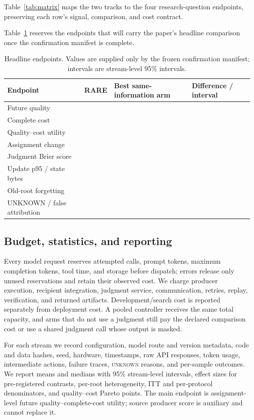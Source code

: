 \documentclass[sigconf,anonymous]{aamas}
\newcommand{\blank}{\textemdash}
\newcommand{\unknown}{\textsc{unknown}}
\begin{document}
Table~\ref{tab:matrix} maps the two tracks to the four research-question endpoints, preserving each row's signal, comparison, and cost contract.

Table~\ref{tab:headline} reserves the endpoints that will carry the paper's headline comparison once the confirmation manifest is complete.
\begin{table}[t]
\centering\small
\caption{Headline endpoints. Values are supplied only by the frozen confirmation manifest; intervals are stream-level 95\% intervals.}
\label{tab:headline}
\begin{tabular}{p{}p{}p{}p{}}
\toprule
Endpoint & RARE & Best same-information arm & Difference / interval\\
\midrule
Future quality & \blank & \blank & \blank\\
Complete cost & \blank & \blank & \blank\\
Quality--cost utility & \blank & \blank & \blank\\
Assignment change & \blank & \blank & \blank\\
Judgment Brier score & \blank & \blank & \blank\\
Update p95 / state bytes & \blank & \blank & \blank\\
Old-root forgetting & \blank & \blank & \blank\\
UNKNOWN / false attribution & \blank & \blank & \blank\\
\bottomrule
\end{tabular}
\end{table}

\subsection{Budget, statistics, and reporting}
Every model request reserves attempted calls, prompt tokens, maximum completion tokens, tool time, and storage before dispatch; errors release only unused reservations and retain their observed cost. We charge producer execution, recipient integration, judgment service, communication, retries, replay, verification, and returned artifacts. Development/search cost is reported separately from deployment cost. A pooled controller receives the same total capacity, and arms that do not use a judgment still pay the declared comparison cost or use a shared judgment call whose output is masked.

For each stream we record configuration, model route and version metadata, code and data hashes, seed, hardware, timestamps, raw API responses, token usage, intermediate actions, failure traces, \unknown{} reasons, and per-sample outcomes. We report means and medians with 95\% stream-level intervals, effect sizes for pre-registered contrasts, per-root heterogeneity, ITT and per-protocol denominators, and quality--cost Pareto points. The main endpoint is assignment-level future quality--complete-cost utility; source producer score is auxiliary and cannot replace it.
\end{document}

